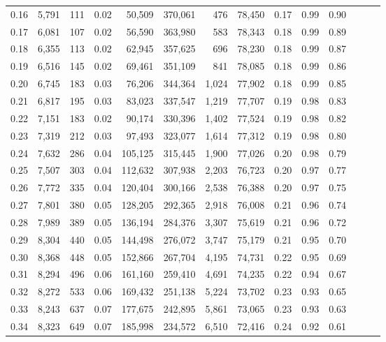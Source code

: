 \begin{tabular}{rrrrrrrrrrrrrr}
0.16 &  5,791 &    111 &  0.02 &   50,509 &  370,061 &     476 &  78,450 &  0.17 &  0.99 &      0.90 \\
0.17 &  6,081 &    107 &  0.02 &   56,590 &  363,980 &     583 &  78,343 &  0.18 &  0.99 &      0.89 \\
0.18 &  6,355 &    113 &  0.02 &   62,945 &  357,625 &     696 &  78,230 &  0.18 &  0.99 &      0.87 \\
0.19 &  6,516 &    145 &  0.02 &   69,461 &  351,109 &     841 &  78,085 &  0.18 &  0.99 &      0.86 \\
0.20 &  6,745 &    183 &  0.03 &   76,206 &  344,364 &   1,024 &  77,902 &  0.18 &  0.99 &      0.85 \\
0.21 &  6,817 &    195 &  0.03 &   83,023 &  337,547 &   1,219 &  77,707 &  0.19 &  0.98 &      0.83 \\
0.22 &  7,151 &    183 &  0.02 &   90,174 &  330,396 &   1,402 &  77,524 &  0.19 &  0.98 &      0.82 \\
0.23 &  7,319 &    212 &  0.03 &   97,493 &  323,077 &   1,614 &  77,312 &  0.19 &  0.98 &      0.80 \\
0.24 &  7,632 &    286 &  0.04 &  105,125 &  315,445 &   1,900 &  77,026 &  0.20 &  0.98 &      0.79 \\
0.25 &  7,507 &    303 &  0.04 &  112,632 &  307,938 &   2,203 &  76,723 &  0.20 &  0.97 &      0.77 \\
0.26 &  7,772 &    335 &  0.04 &  120,404 &  300,166 &   2,538 &  76,388 &  0.20 &  0.97 &      0.75 \\
0.27 &  7,801 &    380 &  0.05 &  128,205 &  292,365 &   2,918 &  76,008 &  0.21 &  0.96 &      0.74 \\
0.28 &  7,989 &    389 &  0.05 &  136,194 &  284,376 &   3,307 &  75,619 &  0.21 &  0.96 &      0.72 \\
0.29 &  8,304 &    440 &  0.05 &  144,498 &  276,072 &   3,747 &  75,179 &  0.21 &  0.95 &      0.70 \\
0.30 &  8,368 &    448 &  0.05 &  152,866 &  267,704 &   4,195 &  74,731 &  0.22 &  0.95 &      0.69 \\
0.31 &  8,294 &    496 &  0.06 &  161,160 &  259,410 &   4,691 &  74,235 &  0.22 &  0.94 &      0.67 \\
0.32 &  8,272 &    533 &  0.06 &  169,432 &  251,138 &   5,224 &  73,702 &  0.23 &  0.93 &      0.65 \\
0.33 &  8,243 &    637 &  0.07 &  177,675 &  242,895 &   5,861 &  73,065 &  0.23 &  0.93 &      0.63 \\
0.34 &  8,323 &    649 &  0.07 &  185,998 &  234,572 &   6,510 &  72,416 &  0.24 &  0.92 &      0.61 \\

\end{tabular}
